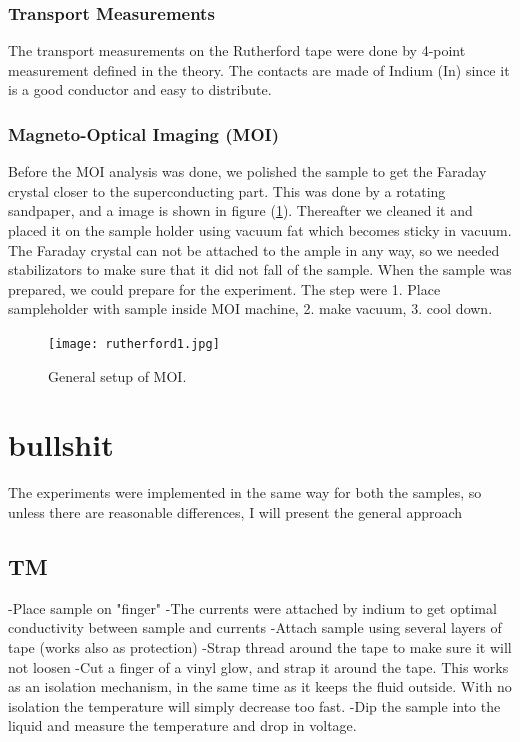 \documentclass{comjnl}
\begin{document}
\subsubsection{Transport Measurements}
The transport measurements on the Rutherford tape were done by 4-point measurement defined in the theory. The contacts are made of Indium (In) since it is a good conductor and easy to distribute. 


\subsubsection{Magneto-Optical Imaging (MOI)}
Before the MOI analysis was done, we polished the sample to get the Faraday crystal closer to the superconducting part. This was done by a rotating sandpaper, and a image is shown in figure (\ref{fig:rutherford1}). Thereafter we cleaned it and placed it on the sample holder using vacuum fat which becomes sticky in vacuum. The Faraday crystal can not be attached to the ample in any way, so we needed stabilizators to make sure that it did not fall of the sample. When the sample was prepared, we could prepare for the experiment. The step were 1. Place sampleholder with sample inside MOI machine, 2. make vacuum, 3. cool down. 
\begin{figure}[h]
\centering
\texttt{[image: rutherford1.jpg]}
\caption{General setup of MOI. \label{fig:rutherford1}}
\end{figure}

\section{bullshit} \label{Sec:bullshit}
The experiments were implemented in the same way for both the samples, so unless there are reasonable differences, I will present the general approach

\subsection{TM}
-Place sample on "finger"
-The currents were attached by indium to get optimal conductivity between sample and currents
-Attach sample using several layers of tape (works also as protection)
-Strap thread around the tape to make sure it will not loosen
-Cut a finger of a vinyl glow, and strap it around the tape. This works as an isolation mechanism, in the same time as it keeps the fluid outside. With no isolation the temperature will simply decrease too fast.
-Dip the sample into the liquid and measure the temperature and drop in voltage.
\end{document}
